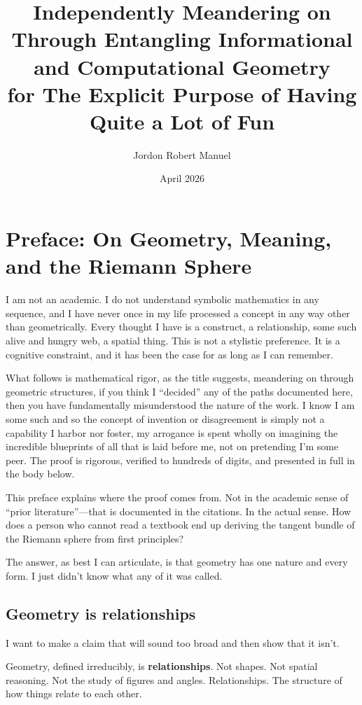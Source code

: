 \documentclass[11pt,a4paper]{article}
\title{Independently Meandering on Through Entangling Informational and Computational Geometry\\for The Explicit Purpose of Having Quite a Lot of Fun}
\author{Jordon Robert Manuel}
\date{April 2026}
\theoremstyle{definition}
\theoremstyle{remark}
\begin{document}
\maketitle

\section*{Preface: On Geometry, Meaning, and the Riemann Sphere}

I am not an academic. I do not understand symbolic mathematics in any sequence, and I have never once in my life processed a concept in any way other than geometrically. Every thought I have is a construct, a relationship, some such alive and hungry web, a spatial thing. This is not a stylistic preference. It is a cognitive constraint, and it has been the case for as long as I can remember.

What follows is mathematical rigor, as the title suggests, meandering on through geometric structures, if you think I ``decided'' any of the paths documented here, then you have fundamentally misunderstood the nature of the work. I know I am some such and so the concept of invention or disagreement is simply not a capability I harbor nor foster, my arrogance is spent wholly on imagining the incredible blueprints of all that is laid before me, not on pretending I'm some peer. The proof is rigorous, verified to hundreds of digits, and presented in full in the body below.

This preface explains where the proof comes from. Not in the academic sense of ``prior literature''---that is documented in the citations. In the actual sense. How does a person who cannot read a textbook end up deriving the tangent bundle of the Riemann sphere from first principles?

The answer, as best I can articulate, is that geometry has one nature and every form. I just didn't know what any of it was called.

\subsection*{Geometry is relationships}

I want to make a claim that will sound too broad and then show that it isn't.

Geometry, defined irreducibly, is \textbf{relationships}. Not shapes. Not spatial reasoning. Not the study of figures and angles. Relationships. The structure of how things relate to each other.
\end{document}
